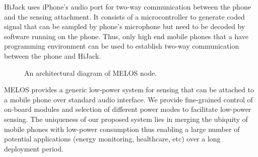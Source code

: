 \documentclass[10pt]{sigplan-proc-varsize}
\newcommand{\redcolor}[1]{\textcolor{red}{#1}}
\newcommand{\melos}{MELOS }
\begin{document}
HiJack uses iPhone's audio port for two-way communication between the phone and the sensing attachment. It consists of a microcontroller to generate coded signal that can be sampled by phone's microphone but need to be decoded by software running on the phone. Thus, only high end mobile phones that a have programming environment can be used to establish two-way communication between the phone and HiJack.

\begin{figure}
\centering
{}
\caption{An architectural diagram of \melos node.}
\label{fig:blockdiagram}
\end{figure}


\melos provides a generic low-power system for sensing that can be attached to a mobile phone over standard audio interface. We provide fine-grained control of on-board modules and selection of different power modes to facilitate low-power sensing. The uniqueness of our proposed system lies in merging the ubiquity of mobile phones with low-power consumption thus enabling a large number of potential applications (energy monitoring, healthcare, etc) over a long deployment period.
\end{document}
